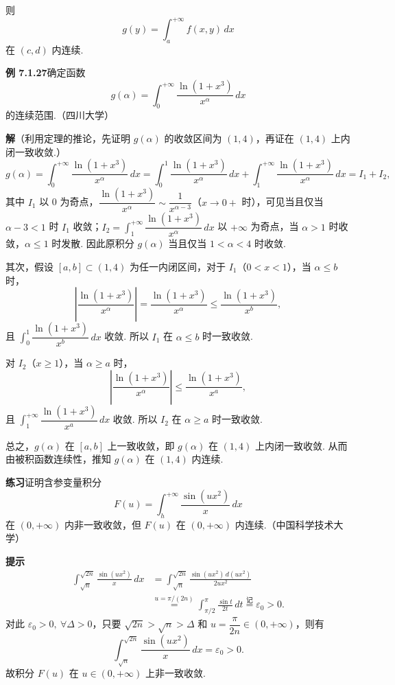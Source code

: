 \documentclass[UTF8, 12pt, fontset=fandol, oneside]{ctexart}
\begin{document}
则
\[
g(y)=\int_a^{+\infty}f(x,y)\,dx
\]
在 $(c,d)$ 内连续.

\noindent\textbf{例 7.1.27}\quad 确定函数
\[
g(\alpha)=\int_0^{+\infty}\frac{\ln(1+x^3)}{x^\alpha}\,dx
\]
的连续范围.（四川大学）

\noindent\textbf{解}\quad （利用定理的推论，先证明 $g(\alpha)$ 的收敛区间为 $(1,4)$，再证在 $(1,4)$ 上内闭一致收敛.）
\[
g(\alpha)=\int_0^{+\infty}\frac{\ln(1+x^3)}{x^\alpha}\,dx
=\int_0^1\frac{\ln(1+x^3)}{x^\alpha}\,dx+\int_1^{+\infty}\frac{\ln(1+x^3)}{x^\alpha}\,dx
=I_1+I_2,
\]
其中 $I_1$ 以 0 为奇点，$\dfrac{\ln(1+x^3)}{x^\alpha}\sim\dfrac1{x^{\alpha-3}}$（$x\to0+$ 时），可见当且仅当 $\alpha-3<1$ 时 $I_1$ 收敛；$I_2=\displaystyle\int_1^{+\infty}\dfrac{\ln(1+x^3)}{x^\alpha}\,dx$ 以 $+\infty$ 为奇点，当 $\alpha>1$ 时收敛，$\alpha\le1$ 时发散. 因此原积分 $g(\alpha)$ 当且仅当 $1<\alpha<4$ 时收敛.

其次，假设 $[a,b]\subset(1,4)$ 为任一内闭区间，对于 $I_1$（$0<x<1$），当 $\alpha\le b$ 时，
\[
\left|\frac{\ln(1+x^3)}{x^\alpha}\right|
=\frac{\ln(1+x^3)}{x^\alpha}
\le\frac{\ln(1+x^3)}{x^b},
\]
且 $\displaystyle\int_0^1\dfrac{\ln(1+x^3)}{x^b}\,dx$ 收敛. 所以 $I_1$ 在 $\alpha\le b$ 时一致收敛.

对 $I_2$（$x\ge1$），当 $\alpha\ge a$ 时，
\[
\left|\frac{\ln(1+x^3)}{x^\alpha}\right|
\le\frac{\ln(1+x^3)}{x^a},
\]
且 $\displaystyle\int_1^{+\infty}\dfrac{\ln(1+x^3)}{x^a}\,dx$ 收敛. 所以 $I_2$ 在 $\alpha\ge a$ 时一致收敛.

总之，$g(\alpha)$ 在 $[a,b]$ 上一致收敛，即 $g(\alpha)$ 在 $(1,4)$ 上内闭一致收敛. 从而由被积函数连续性，推知 $g(\alpha)$ 在 $(1,4)$ 内连续.

\noindent\textbf{练习}\quad 证明含参变量积分
\[
F(u)=\int_h^{+\infty}\frac{\sin(ux^2)}{x}\,dx
\]
在 $(0,+\infty)$ 内非一致收敛，但 $F(u)$ 在 $(0,+\infty)$ 内连续.（中国科学技术大学）

\noindent\textbf{提示}\quad
\[
\begin{aligned}
\int_{\sqrt n}^{\sqrt{2n}}\frac{\sin(ux^2)}{x}\,dx
&=\int_{\sqrt n}^{\sqrt{2n}}\frac{\sin(ux^2)\,d(ux^2)}{2ux^2}\\
&\overset{u=\pi/(2n)}{=}\int_{\pi/2}^{\pi}\frac{\sin t}{2t}\,dt
\overset{\text{记}}{=}\varepsilon_0>0.
\end{aligned}
\]
对此 $\varepsilon_0>0,\ \forall\Delta>0$，只要 $\sqrt{2n}>\sqrt n>\Delta$ 和 $u=\dfrac{\pi}{2n}\in(0,+\infty)$，则有
\[
\int_{\sqrt n}^{\sqrt{2n}}\frac{\sin(ux^2)}{x}\,dx=\varepsilon_0>0.
\]
故积分 $F(u)$ 在 $u\in(0,+\infty)$ 上非一致收敛.
\end{document}
